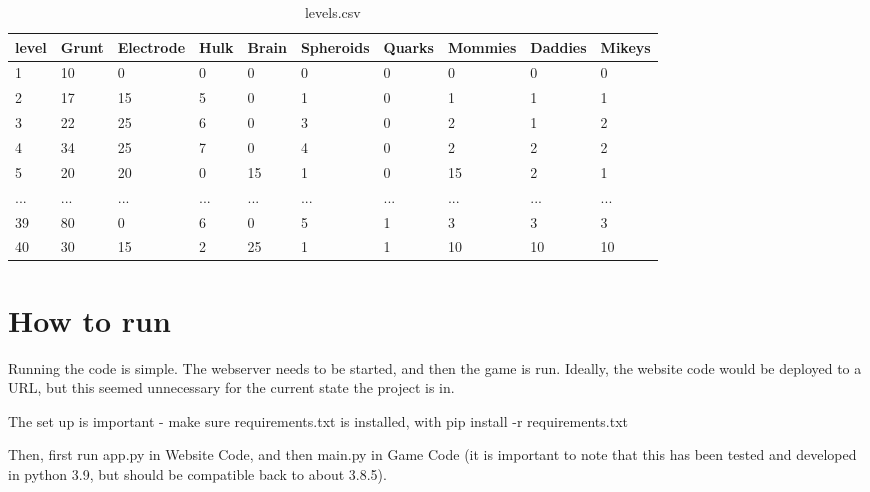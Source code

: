 \begin{table}[H]
\begin{tabular}{|l|l|l|l|l|l|l|l|l|l|}
\hline
\rowcolor[HTML]{C0C0C0} 
level & Grunt & Electrode & Hulk & Brain & Spheroids & Quarks & Mommies & Daddies & Mikeys \\ \hline
1     & 10    & 0         & 0    & 0     & 0         & 0      & 0       & 0       & 0      \\ \hline
2     & 17    & 15        & 5    & 0     & 1         & 0      & 1       & 1       & 1      \\ \hline
3     & 22    & 25        & 6    & 0     & 3         & 0      & 2       & 1       & 2      \\ \hline
4     & 34    & 25        & 7    & 0     & 4         & 0      & 2       & 2       & 2      \\ \hline
5     & 20    & 20        & 0    & 15    & 1         & 0      & 15      & 2       & 1      \\ \hline
... &... &... &... &... &... &... &... &... &... \\ \hline
39    & 80    & 0         & 6    & 0     & 5         & 1      & 3       & 3       & 3      \\ \hline
40    & 30    & 15        & 2    & 25    & 1         & 1      & 10      & 10      & 10     \\ \hline
\end{tabular}
\caption{levels.csv}
\end{table}

\section{How to run}
Running the code is simple. The webserver needs to be started, and then the game is run. Ideally, the website code would be deployed to a URL, but this seemed unnecessary for the current state the project is in. 

The set up is important - make sure requirements.txt is installed, with pip install -r requirements.txt

Then, first run app.py in Website Code, and then main.py in Game Code (it is important to note that this has been tested and developed in python 3.9, but should be compatible back to about 3.8.5).